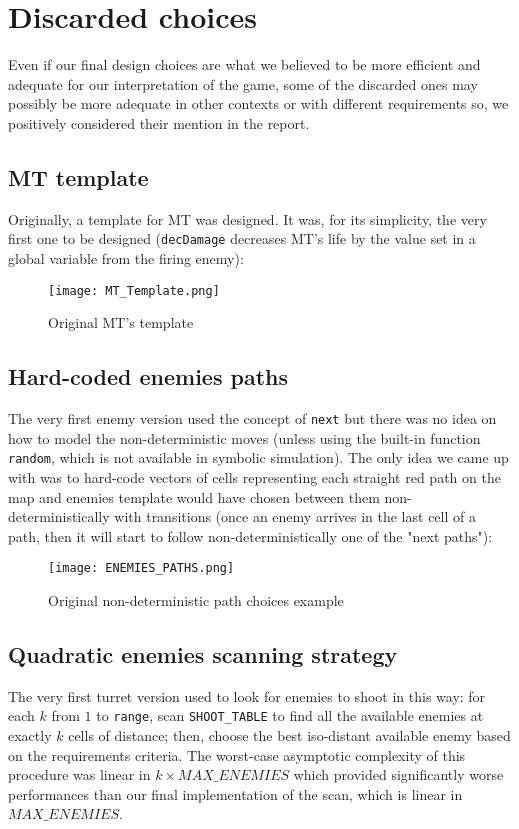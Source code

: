 \documentclass[
10pt, %
a4paper, %
oneside, %
headinclude,footinclude, %
BCOR5mm, %
]{scrartcl}
\begin{document}
	\section{Discarded choices}
		Even if our final design choices are what we believed to be more efficient and adequate for our interpretation of the game, some of the discarded ones may possibly be more adequate in other contexts or with different requirements so, we positively considered their mention in the report.
		\subsection{MT template}
			Originally, a template for MT was designed. It was, for its simplicity, the very first one to be designed (\texttt{decDamage} decreases MT's life by the value set in a global variable from the firing enemy):
			
			\begin{figure}[h!]
				\centering
				\texttt{[image: MT\_Template.png]}
				\caption{Original MT's template}
			\end{figure}
		\subsection{Hard-coded enemies paths}
			The very first enemy version used the concept of \texttt{next} but there was no idea on how to model the non-deterministic moves (unless using the built-in function \texttt{random}, which is not available in symbolic simulation). The only idea we came up with was to hard-code vectors of cells representing each straight red path on the map and enemies template would have chosen between them non-deterministically with transitions (once an enemy arrives in the last cell of a path, then it will start to follow non-deterministically one of the "next paths"):
			
			\begin{figure}[h!]
				\centering
				\texttt{[image: ENEMIES\_PATHS.png]}
				\caption{Original non-deterministic path choices example}
			\end{figure}
		\subsection{Quadratic enemies scanning strategy}
			The very first turret version used to look for enemies to shoot in this way: for each $k$ from $1$ to \texttt{range}, scan \texttt{SHOOT\_TABLE} to find all the available enemies at exactly $k$ cells of distance; then, choose the best iso-distant available enemy based on the requirements criteria. The worst-case asymptotic complexity of this procedure was linear in $k\times MAX\_ENEMIES$ which provided significantly worse performances than our final implementation of the scan, which is linear in $MAX\_ENEMIES$.
\end{document}
